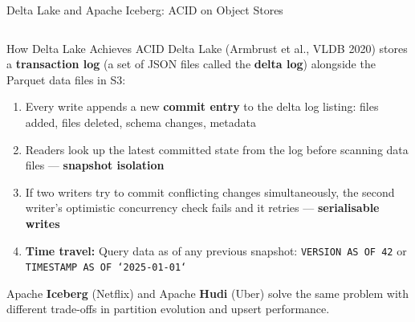 \documentclass[aspectratio=169,10pt]{beamer}
\begin{document}
\begin{frame}{Delta Lake and Apache Iceberg: ACID on Object Stores}
  \begin{columns}[T]
      \begin{block}{How Delta Lake Achieves ACID}
        Delta Lake (Armbrust et al., VLDB 2020) stores a \textbf{transaction log} (a set of JSON files called the \textbf{delta log}) alongside the Parquet data files in S3:
        \begin{enumerate}
          \item Every write appends a new \textbf{commit entry} to the delta log listing: files added, files deleted, schema changes, metadata
          \item Readers look up the latest committed state from the log before scanning data files --- \textbf{snapshot isolation}
          \item If two writers try to commit conflicting changes simultaneously, the second writer's optimistic concurrency check fails and it retries --- \textbf{serialisable writes}
          \item \textbf{Time travel:} Query data as of any previous snapshot: \texttt{VERSION AS OF 42} or \texttt{TIMESTAMP AS OF `2025-01-01`}
        \end{enumerate}
        \vspace{4pt}
        Apache \textbf{Iceberg} (Netflix) and Apache \textbf{Hudi} (Uber) solve the same problem with different trade-offs in partition evolution and upsert performance.
      \end{block}


\end{columns}
\end{frame}
\end{document}
